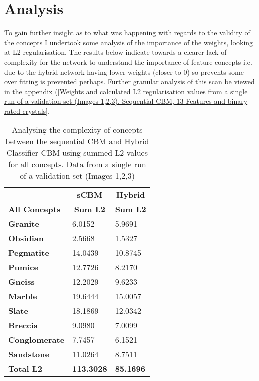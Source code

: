 \chapter{Analysis}

To gain further insight as to what was happening with regards to the validity of the concepts I undertook some analysis of the importance of the weights, looking at L2 regularisation. The results below indicate towards a clearer lack of complexity for the network to understand the importance of feature concepts i.e. due to the hybrid network having lower weights (closer to 0) so prevents some over fitting is prevented perhaps. Further granular analysis of this scan be viewed in the appendix (\ref{Weights and calculated L2 regularisation values from a single run of a validation set (Images 1,2,3). Sequential CBM, 13 Features and binary rated crystals}.

\begin{table}[H]
\centering
\begin{tabular}{@{}lll@{}}
                      & \multicolumn{1}{c}{\cellcolor[HTML]{DDEBF7}\textbf{sCBM}} & \multicolumn{1}{c}{\cellcolor[HTML]{E2EFDA}\textbf{Hybrid}} \\
\textbf{All Concepts} & \multicolumn{1}{c}{\textbf{Sum L2}}                       & \multicolumn{1}{c}{\textbf{Sum L2}}                         \\
\rowcolor[HTML]{F2F2F2} 
\textbf{Granite}      & 6.0152  & 5.9691  \\
\textbf{Obsidian}     & 2.5668  & 1.5327  \\
\rowcolor[HTML]{F2F2F2} 
\textbf{Pegmatite}    & 14.0439 & 10.8745 \\
\textbf{Pumice}       & 12.7726 & 8.2170  \\
\rowcolor[HTML]{F2F2F2} 
\textbf{Gneiss}       & 12.2029 & 9.6233  \\
\textbf{Marble}       & 19.6444 & 15.0057 \\
\rowcolor[HTML]{F2F2F2} 
\textbf{Slate}        & 18.1869 & 12.0342 \\
\textbf{Breccia}      & 9.0980  & 7.0099  \\
\rowcolor[HTML]{F2F2F2} 
\textbf{Conglomerate} & 7.7457  & 6.1521  \\
\textbf{Sandstone}    & 11.0264 & 8.7511  \\
\rowcolor[HTML]{FFF2CC} 
\textbf{Total L2}     & \textbf{113.3028}                                         & \textbf{85.1696}                                           
\end{tabular}
\\
\caption{Analysing the complexity of concepts between the sequential CBM and Hybrid Classifier CBM using summed L2 values for all concepts.  Data from a single run of a validation set (Images 1,2,3)}
\end{table}